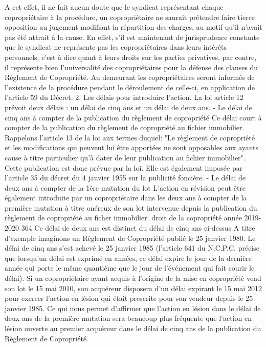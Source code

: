 A cet effet, il ne fait aucun doute que le syndicat représentant chaque copropriétaire à la procédure, un copropriétaire ne saurait prétendre faire tierce opposition au jugement modifiant la répartition des charges, au motif qu'il n'avait pas été attrait à la cause.
En effet, s'il est maintenant de jurisprudence constante que le syndicat ne représente pas les copropriétaires dans leurs intérêts personnels, c'est à dire quant à leurs droits sur les parties privatives, par contre, il représente bien l'universalité des copropriétaires pour la défense des clauses du Règlement de Copropriété. Au demeurant les copropriétaires seront informés de l'existence de la procédure pendant le déroulement de celle-ci, en application de l'article 59 du Décret.
2. Les délais pour introduire l'action.
La loi article 12 prévoit deux délais : un délai de cinq ans et un délai de deux ans.
- Le délai de cinq ans à compter de la publication du règlement de copropriété
Ce délai court à compter de la publication du règlement de copropriété au fichier immobilier.
Rappelons l'article 13 de la loi aux termes duquel:
"Le règlement de copropriété et les modifications qui peuvent lui être apportées ne sont opposables aux ayants cause à titre particulier qu'à dater de leur publication au fichier immobilier".
Cette publication est donc prévue par la loi. Elle est également imposée par l'article 35 du décret du 4 janvier 1955 sur la publicité foncière.
- Le délai de deux ans à compter de la 1ère mutation du lot
L'action en révision peut être également introduite par un copropriétaire dans les deux ans à compter de la première mutation à titre onéreux de son lot intervenue depuis la publication du règlement de copropriété au ficher immobilier.
droit de la copropriété année 2019-2020
364
Ce délai de deux ans est distinct du délai de cinq ans ci-dessus
A titre d'exemple imaginons un Règlement de Copropriété publié le 25 janvier 1980. Le délai de cinq ans s’est achevé le 25 janvier 1985 (l'article 641 du N.C.P.C. précise que lorsqu'un délai est exprimé en années, ce délai expire le jour de la dernière année qui porte le même quantième que le jour de l’événement qui fait courir le délai).
Si un copropriétaire ayant acquis à l'origine de la mise en copropriété vend son lot le 15 mai 2010, son acquéreur disposera d'un délai expirant le 15 mai 2012 pour exercer l'action en lésion qui était prescrite pour son vendeur depuis le 25 janvier 1985. Ce qui nous permet d'affirmer que l'action en lésion dans le délai de deux ans de la première mutation sera beaucoup plus fréquente que l'action en lésion ouverte au premier acquéreur dans le délai de cinq ans de la publication du Règlement de Copropriété.
